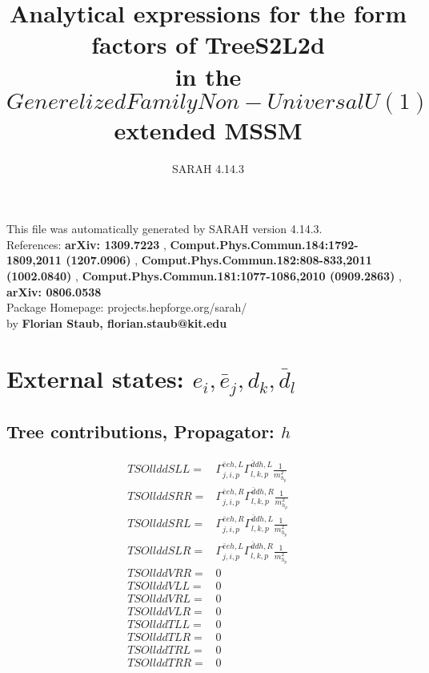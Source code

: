 \documentclass[A4,landscape]{article}
\begin{document}
\title{Analytical expressions for the form factors of TreeS2L2d\\ in the $Generelized Family Non-Universal U(1)$ extended MSSM } 
 \author{SARAH 4.14.3} 
 \maketitle 
 \vspace{10cm} 
This file was automatically generated by SARAH version 4.14.3.  \\ 
References: {\bf arXiv: 1309.7223 }, {\bf Comput.Phys.Commun.184:1792-1809,2011 (1207.0906) }, {\bf Comput.Phys.Commun.182:808-833,2011 (1002.0840) }, {\bf Comput.Phys.Commun.181:1077-1086,2010 (0909.2863) }, {\bf arXiv: 0806.0538 } \\ 
Package Homepage: projects.hepforge.org/sarah/ \\ 
by {\bf Florian Staub, florian.staub@kit.edu} 
 \pagebreak 
 \tableofcontents 
 \pagebreak 
\section{External states: ${e_{{i}}, \bar{e}_{{j}}, d_{{k}}, \bar{d}_{{l}}}$} 
\subsection{Tree contributions, Propagator: $h$} 

\begin{align} 
  TSOllddSLL= & \Gamma^{\bar{e}e h ,L}_{j, i, p} \Gamma^{\bar{d}d h ,L}_{l, k, p} \frac{1}{m^2_{h_{{p}}}} \\ 
  TSOllddSRR= & \Gamma^{\bar{e}e h ,R}_{j, i, p} \Gamma^{\bar{d}d h ,R}_{l, k, p} \frac{1}{m^2_{h_{{p}}}} \\ 
  TSOllddSRL= & \Gamma^{\bar{e}e h ,R}_{j, i, p} \Gamma^{\bar{d}d h ,L}_{l, k, p} \frac{1}{m^2_{h_{{p}}}} \\ 
  TSOllddSLR= & \Gamma^{\bar{e}e h ,L}_{j, i, p} \Gamma^{\bar{d}d h ,R}_{l, k, p} \frac{1}{m^2_{h_{{p}}}} \\ 
  TSOllddVRR= & 0 \\ 
  TSOllddVLL= & 0 \\ 
  TSOllddVRL= & 0 \\ 
  TSOllddVLR= & 0 \\ 
  TSOllddTLL= & 0 \\ 
  TSOllddTLR= & 0 \\ 
  TSOllddTRL= & 0 \\ 
  TSOllddTRR= & 0 \\ 
\end{align} 
\end{document}
